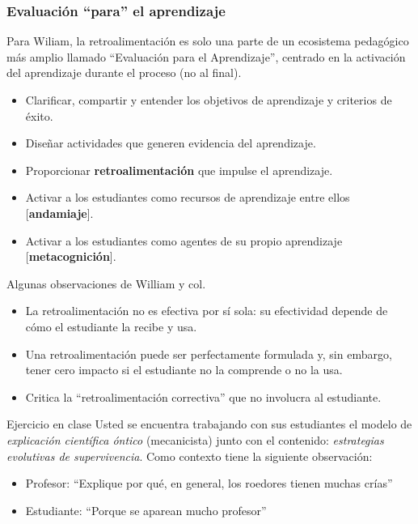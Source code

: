\documentclass[11pt, aspectratio=169, xcolor=table,hyphens]{beamer}
\begin{document}
\begin{frame}[allowframebreaks]
	\frametitle{Evaluación ``para'' el aprendizaje \cite{william08}}

Para Wiliam, la retroalimentación es solo una parte de un ecosistema pedagógico más amplio llamado ``Evaluación para el Aprendizaje'', centrado en la activación del aprendizaje durante el proceso (no al final).

\begin{itemize}
\item Clarificar, compartir y entender los objetivos de aprendizaje y criterios de éxito.
\item Diseñar actividades que generen evidencia del aprendizaje.
\item Proporcionar \textbf{retroalimentación} que impulse el aprendizaje.
\item Activar a los estudiantes como recursos de aprendizaje entre ellos [\textbf{andamiaje}].
\item Activar a los estudiantes como agentes de su propio aprendizaje [\textbf{metacognición}].

\end{itemize}

Algunas observaciones de William y col.
\begin{itemize}

\item La retroalimentación no es efectiva por sí sola: su efectividad depende de cómo el estudiante la recibe y usa.

\item Una retroalimentación puede ser perfectamente formulada y, sin embargo, tener cero impacto si el estudiante no la comprende o no la usa.

\item Critica la “retroalimentación correctiva” que no involucra al estudiante.

\end{itemize}
\end{frame}

\begin{frame}{Ejercicio en clase}
	Usted se encuentra trabajando con sus estudiantes el modelo de \textit{explicación científica óntico} (mecanicista) junto con el contenido: \textit{estrategias evolutivas de supervivencia}. Como contexto tiene la siguiente observación:
	\begin{itemize}[<+->]
		\item Profesor: ``Explique por qué, en general, los roedores tienen muchas crías''
		\item Estudiante:  ``Porque se aparean mucho profesor''
	\end{itemize}

\end{frame}
\end{document}
